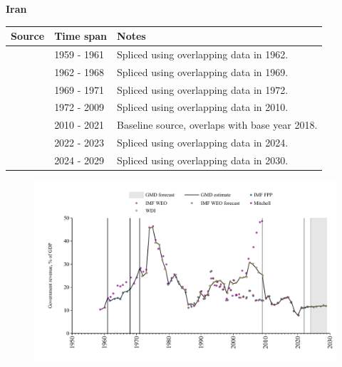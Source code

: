 \documentclass[12pt,a4paper,landscape]{article}
\begin{document}
\begin{adjustbox}{max totalsize={\paperwidth}{\paperheight},center}
\begin{minipage}[t][\textheight][t]{\textwidth}
\vspace*{0.5cm}
{}
\begin{center}
{\Large\bfseries Iran}
\end{center}
\vspace{0.5cm}
\begin{table}[H]
\centering
\small
\begin{tabular}{|l|l|l|}
\hline
\textbf{Source} & \textbf{Time span} & \textbf{Notes} \\
\hline
\rowcolor{white}\cite{Mitchell}& 1959 - 1961 &Spliced using overlapping data in 1962.\\
\rowcolor{lightgray}\cite{IMF_FPP}& 1962 - 1968 &Spliced using overlapping data in 1969.\\
\rowcolor{white}\cite{Mitchell}& 1969 - 1971 &Spliced using overlapping data in 1972.\\
\rowcolor{lightgray}\cite{WDI}& 1972 - 2009 &Spliced using overlapping data in 2010.\\
\rowcolor{white}\cite{IMF_WEO}& 2010 - 2021 &Baseline source, overlaps with base year 2018.\\
\rowcolor{lightgray}\cite{IMF_FPP}& 2022 - 2023 &Spliced using overlapping data in 2024.\\
\rowcolor{white}\cite{IMF_WEO_forecast}& 2024 - 2029 &Spliced using overlapping data in 2030.\\
\hline
\end{tabular}
\end{table}
\begin{figure}[H]
\centering
\includegraphics[width=\textwidth,height=0.6\textheight,keepaspectratio]{graphs/IRN_govrev_GDP.pdf}
\end{figure}
\end{minipage}
\end{adjustbox}
\end{document}
